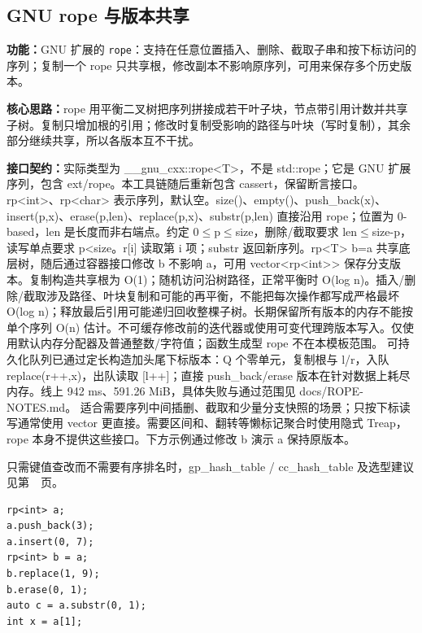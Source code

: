 \subsection{GNU rope 与版本共享}\label{compact-rp}

\noindent\textbf{功能：}\allowbreak GNU 扩展的 \texttt{rope}：支持在任意位置插入、删除、截取子串和按下标访问的序列；复制一个 rope 只共享根，修改副本不影响原序列，可用来保存多个历史版本。

\textbf{核心思路：}\allowbreak rope 用平衡二叉树把序列拼接成若干叶子块，节点带引用计数并共享子树。复制只增加根的引用；修改时复制受影响的路径与叶块（写时复制），其余部分继续共享，所以各版本互不干扰。



{\sloppy{}\noindent\textbf{接口契约：}实际类型为 \_\_gnu\_cxx::rope<T>，不是 std::rope；它是 GNU 扩展序列，包含 ext/rope。本工具链随后重新包含 cassert，保留断言接口。rp<int>、rp<char> 表示序列，默认空。size()、empty()、push\_back(x)、insert(p,x)、erase(p,len)、replace(p,x)、substr(p,len) 直接沿用 rope；位置为 0-based，len 是长度而非右端点。约定 0$\le$p$\le$size，删除/截取要求 len$\le$size-p，读写单点要求 p<size。r[i] 读取第 i 项；substr 返回新序列。rp<T> b=a 共享底层树，随后通过容器接口修改 b 不影响 a，可用 vector<rp<int>> 保存分支版本。复制构造共享根为 O(1)；随机访问沿树路径，正常平衡时 O(log n)。插入/删除/截取涉及路径、叶块复制和可能的再平衡，不能把每次操作都写成严格最坏 O(log n)；释放最后引用可能递归回收整棵子树。长期保留所有版本的内存不能按单个序列 O(n) 估计。不可缓存修改前的迭代器或使用可变代理跨版本写入。仅使用默认内存分配器及普通整数/字符值；函数生成型 rope 不在本模板范围。 可持久化队列已通过定长构造加头尾下标版本：Q 个零单元，复制根与 l/r，入队 replace(r++,x)，出队读取 [l++]；直接 push\_back/erase 版本在针对数据上耗尽内存。线上 942 ms、591.26 MiB，具体失败与通过范围见 docs/ROPE-NOTES.md。 适合需要序列中间插删、截取和少量分支快照的场景；只按下标读写通常使用 vector 更直接。需要区间和、翻转等懒标记聚合时使用隐式 Treap，rope 本身不提供这些接口。下方示例通过修改 b 演示 a 保持原版本。\par}

只需键值查改而不需要有序排名时，gp\_hash\_table / cc\_hash\_table 及选型建议见第~\pageref{compact-gp_map}~页。



\begin{lstlisting}
rp<int> a;
a.push_back(3);
a.insert(0, 7);
rp<int> b = a;
b.replace(1, 9);
b.erase(0, 1);
auto c = a.substr(0, 1);
int x = a[1];
\end{lstlisting}

